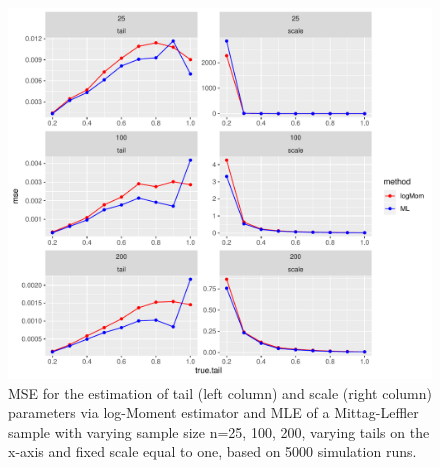 \documentclass[]{elsarticle} %
\begin{document}
\begin{figure}

{\centering \includegraphics[width=0.9\linewidth]{article_springer_files/figure-latex/MSE-1} 

}

\caption{\label{fig:MSE} MSE for the estimation of tail (left column) and scale (right column) parameters via log-Moment estimator and MLE of a Mittag-Leffler sample with varying sample size n=25, 100, 200, varying tails on the x-axis and fixed scale equal to one, based on 5000 simulation runs.}\label{fig:MSE}
\end{figure}
\end{document}
